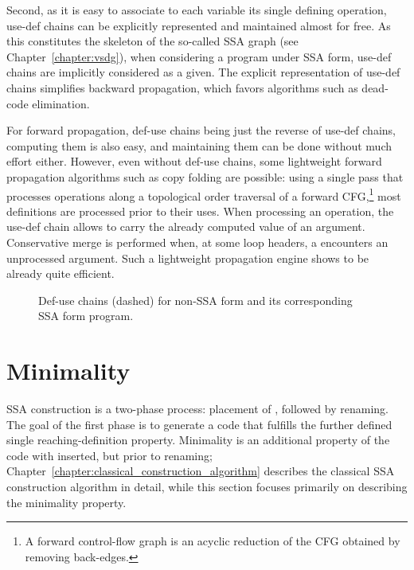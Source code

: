 Second, as it is easy to associate to each variable its single defining operation, use-def chains can be explicitly represented and maintained almost for free. 
As this constitutes the skeleton of the so-called SSA graph (see Chapter~\ref{chapter:vsdg}), when considering a program under SSA form, use-def chains are implicitly considered as a given. 
The explicit representation of use-def chains simplifies backward propagation, which favors algorithms such as dead-code elimination.

For forward propagation, def-use chains being just the reverse of use-def chains, computing them is also easy, and maintaining them can be done without much effort either. 
However, even without def-use chains, some lightweight forward propagation algorithms such as copy folding are possible: 
using a single pass that processes operations along a topological order traversal of a forward CFG,\footnote{A forward control-flow graph is an acyclic reduction of the CFG obtained by removing back-edges.} 
most definitions are processed prior to their uses. 
When processing an operation, the use-def chain allows to carry the already computed value of an argument. 
Conservative merge is performed when, at some loop headers, a \phifun encounters an unprocessed argument. 
Such a lightweight propagation engine shows to be already quite efficient.


\begin{figure}
\caption{Def-use chains (dashed) for non-SSA form and its corresponding SSA form program.}
\label{fig:properties_and_flavors:du} 
\end{figure}



\section{Minimality}
\label{sec:properties_and_flavors:minimality}

SSA construction is a two-phase process: 
placement of \phifuns, followed by renaming. 
The goal of the first phase is to generate a code that fulfills the further defined single reaching-definition property. 
Minimality is an additional property of the code with \phifuns inserted, but prior to renaming; 
Chapter~\ref{chapter:classical_construction_algorithm} describes the classical SSA construction algorithm in detail, while this section focuses primarily on describing the minimality property.

